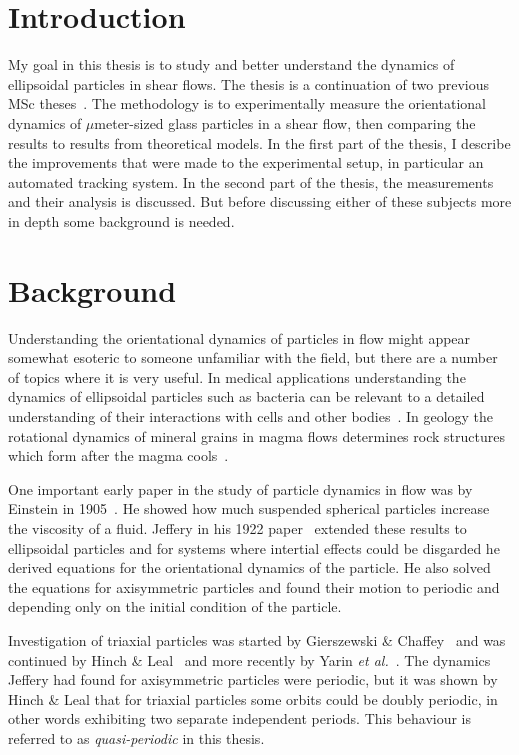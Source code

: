 \section{Introduction}
My goal in this thesis is to study and better understand the dynamics of ellipsoidal particles in shear flows. The thesis is a continuation of two previous MSc theses~\cite{AntonThesis, JonasThesis}. The methodology is to experimentally measure the orientational dynamics of $\mu$meter-sized glass particles in a shear flow, then comparing the results to results from theoretical models. In the first part of the thesis, I describe the improvements that were made to the experimental setup, in particular an automated tracking system. In the second part of the thesis, the measurements and their analysis is discussed. But before discussing either of these subjects more in depth some background is needed.

\section{Background}
Understanding the orientational dynamics of particles in flow might appear somewhat esoteric to someone unfamiliar with the field, but there are a number of topics where it is very useful. In medical applications understanding the dynamics of ellipsoidal particles such as bacteria can be relevant to a detailed understanding of their interactions with cells and other bodies~\cite{Tolga}. In geology the rotational dynamics of mineral grains in magma flows determines rock structures which form after the magma cools~\cite{geology}. 

One important early paper in the study of particle dynamics in flow was by Einstein in 1905~\cite{Einstein}. He showed how much suspended spherical particles increase the viscosity of a fluid. Jeffery in his 1922 paper~\cite{Jeffery} extended these results to ellipsoidal  particles and for systems where intertial effects could be disgarded he derived equations for the orientational dynamics of the particle. He also solved the equations for axisymmetric particles and found their motion to periodic and depending only on the initial condition of the particle. 

Investigation of triaxial particles was started by Gierszewski \& Chaffey~\cite{Chaffey} and was continued by Hinch \& Leal~\cite{Leal} and more recently by Yarin \emph{et al.}~\cite{Yarin}. 
The dynamics Jeffery had found for axisymmetric particles were periodic, but it was shown by Hinch \& Leal that for triaxial particles some orbits could be doubly periodic, in other words exhibiting two separate independent periods. This behaviour is referred to as \emph{quasi-periodic} in this thesis.

